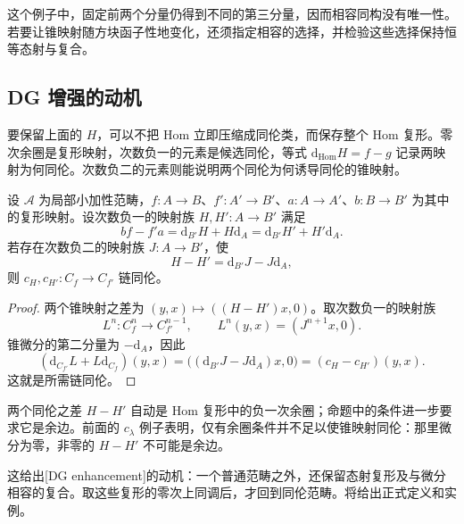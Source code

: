 \ProseParagraphBreak
这个例子中，固定前两个分量仍得到不同的第三分量，因而相容同构没有唯一性。若要让锥映射随方块函子性地变化，还须指定相容的选择，并检验这些选择保持恒等态射与复合。

\subsection{DG 增强的动机}
\label{b4:subsec:1604:03}

要保留上面的 \(H\)，可以不把 Hom 立即压缩成同伦类，而保存整个 Hom 复形。零次余圈是复形映射，次数负一的元素是候选同伦，等式 \(\mathrm{d}_{\operatorname{Hom}}H=f-g\) 记录两映射为何同伦。次数负二的元素则能说明两个同伦为何诱导同伦的锥映射。

\begin{proposition}\label{b4:prop:cone-higher-homotopy}
	设 \(\mathcal A\) 为局部小加性范畴，\(f:A\to B\)、\(f':A'\to B'\)、\(a:A\to A'\)、\(b:B\to B'\) 为其中的复形映射。设次数负一的映射族 \(H,H':A\to B'\) 满足
	\[
		bf-f'a=\mathrm{d}_{B'}H+H\mathrm{d}_A =\mathrm{d}_{B'}H'+H'\mathrm{d}_A.
	\]
	若存在次数负二的映射族 \(J:A\to B'\)，使
	\[
		H-H'=\mathrm{d}_{B'}J-J\mathrm{d}_A,
	\]
	则 \(c_H,c_{H'}:C_f\to C_{f'}\) 链同伦。
\end{proposition}
\begin{proof}
	两个锥映射之差为 \((y,x)\mapsto((H-H')x,0)\)。取次数负一的映射族
	\[
		L^n:C_f^n\longrightarrow C_{f'}^{n-1},\qquad L^n(y,x)=(J^{n+1}x,0).
	\]
	锥微分的第二分量为 \(-\mathrm{d}_A\)，因此
	\[
		(\mathrm{d}_{C_{f'}}L+L\mathrm{d}_{C_f})(y,x) =\bigl((\mathrm{d}_{B'}J-J\mathrm{d}_A)x,0\bigr) =(c_H-c_{H'})(y,x).
	\]
	这就是所需链同伦。
\end{proof}

两个同伦之差 \(H-H'\) 自动是 Hom 复形中的负一次余圈；命题中的条件进一步要求它是余边。前面的 \(c_\lambda\) 例子表明，仅有余圈条件并不足以使锥映射同伦：那里微分为零，非零的 \(H-H'\) 不可能是余边。

\ProseParagraphBreak
这给出[DG enhancement]的动机：一个普通范畴之外，还保留态射复形及与微分相容的复合。取这些复形的零次上同调后，才回到同伦范畴。将给出正式定义和实例。
